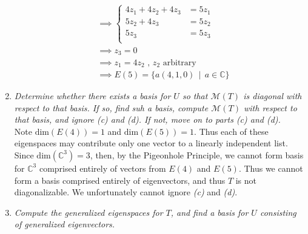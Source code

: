 \documentclass[12pt]{article}
\newcommand{\suchthat}{\, \mid \,}
\begin{document}
\begin{enumerate}[\ \ \it(a)\ \ ]
\begin{align*}
		&\implies \left\{\begin{array}{rl}
			4z_1 + 4z_2 + 4z_3 &= 5z_1 \\
			5z_2 + 4z_3 &= 5z_2 \\
			5z_3 &= 5z_3 \\
		\end{array}\right. \\
		&\implies z_3 = 0 \\
		&\implies z_1 = 4z_2 \text{ , } z_2 \text{ arbitrary} \\
		&\implies E(5) = \{a(4, 1, 0) \suchthat a \in \mathbb{C}\}
	\end{align*}
 	\item {\it Determine whether there exists a basis for $U$ so that $\mathcal{M}(T)$ is diagonal with respect to that basis.  If so, find suh a basis, compute $\mathcal{M}(T)$ with respect to that basis, and ignore (c) and (d).  If not, move on to parts (c) and (d).} \\

	\noindent Note $\text{dim}(E(4)) = 1$ and $\text{dim}(E(5)) = 1$.  Thus each of these eigenspaces may contribute only one vector to a linearly independent list.  Since $\text{dim}(\mathbb{C}^3) = 3$, then, by the Pigeonhole Principle, we cannot form basis for $\mathbb{C}^3$ comprised entirely of vectors from $E(4)$ and $E(5)$.  Thus we cannot form a basis comprised entirely of eigenvectors, and thus $T$ is not diagonalizable.  We unfortunately cannot ignore {\it(c)} and {\it(d)}.
	\item {\it Compute the generalized eigenspaces for $T$, and find a basis for $U$ consisting of generalized eigenvectors.}
	

\end{enumerate}
\end{document}
